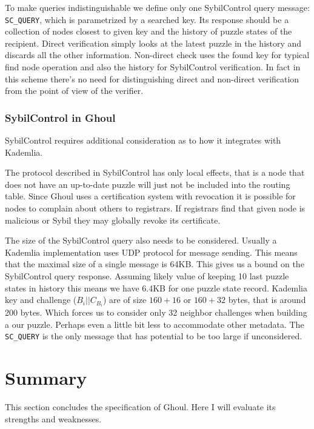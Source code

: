  To make queries indistinguishable we define only one SybilControl query
  message: \texttt{SC\_QUERY}, which is parametrized by a searched key. Its
  response should be a collection of nodes closest to given key and the history
  of puzzle states of the recipient. Direct verification simply looks at the
  latest puzzle in the history and discards all the other information.
  Non-direct check uses the found key for typical find node operation and also
  the history for SybilControl verification. In fact in this scheme there's no
  need for distinguishing direct and non-direct verification from the point of
  view of the verifier.

\subsubsection{SybilControl in Ghoul}
  SybilControl requires additional consideration as to how it integrates with
  Kademlia.

  The protocol described in SybilControl has only local effects, that is a node
  that does not have an up-to-date puzzle will just not be included into the
  routing table. Since Ghoul uses a certification system with revocation it is
  possible for nodes to complain about others to registrars. If registrars find
  that given node is malicious or Sybil they may globally revoke its
  certificate.

  The size of the SybilControl query also needs to be considered. Usually a
  Kademlia implementation uses UDP protocol for message sending. This means that
  the maximal size of a single message is 64KB. This gives us a bound on the
  SybilControl query response. Assuming likely value of keeping 10 last puzzle
  states in history this means we have 6.4KB for one puzzle state record.
  Kademlia key and challenge ($B_i || C_{B_i}$) are of size $160 + 16$ or $160
  + 32$ bytes, that is around 200 bytes. Which forces us to consider only 32
  neighbor challenges when building a our puzzle. Perhaps even a little bit
  less to accommodate other metadata. The \texttt{SC\_QUERY} is the only message
  that has potential to be too large if unconsidered.

\section{Summary}
\label{sec:ghoul_summary}
  This section concludes the specification of Ghoul. Here I will evaluate its
  strengths and weaknesses.
  
